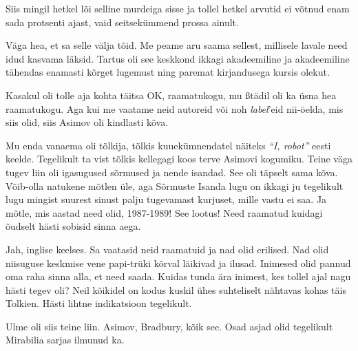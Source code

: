 Siis mingil hetkel lõi selline murdeiga sisse ja tollel hetkel arvutid ei 
võtnud enam sada protsenti ajast, vaid seitsekümmend prossa ainult. 


Väga hea, et sa selle välja tõid. Me peame aru saama sellest, millisele lavale  
need idud  kasvama läksid. 
Tartus oli see keskkond  ikkagi akadeemiline ja akadeemiline tähendas 
enamasti kõrget lugemust ning paremat kirjandusega kursis olekut.

Kasakul oli tolle aja kohta täitsa OK, raamatukogu, 
mu ßtädil oli ka üsna hea raamatukogu. Aga kui me vaatame neid autoreid või noh 
\emph{label}'eid nii-öelda, mis siis olid, siis Asimov oli 
kindlasti kõva. 

Mu enda vanaema oli tõlkija, tõlkis kuuekümnendatel näiteks \emph{\enquote{I, 
robot}} eesti keelde. Tegelikult ta vist tõlkis kellegagi koos terve Asimovi 
kogumiku. Teine väga tugev liin oli igasugused sõrmused ja nende 
isandad. See oli täpselt sama kõva.
Võib-olla natukene mõtlen üle, aga Sõrmuste Isanda lugu  on ikkagi 
ju tegelikult lugu  mingist suurest sinust palju tugevamast kurjuset, mille 
vastu ei saa. Ja mõtle, mis aastad need olid, 1987-1989! See lootus! Need 
raamatud kuidagi õudselt hästi sobisid sinna aega.


Jah, inglise keelses. Sa vaatasid neid raamatuid ja nad olid erilised. Nad olid 
niisuguse keskmise vene  papi-trüki kõrval läikivad ja ilusad. Inimesed olid 
pannud oma  raha sinna alla, et need saada.  Kuidas tunda ära   
inimest, kes tollel ajal nagu hästi tegev oli? Neil kõikidel on kodus kuskil 
ühes suhteliselt nähtavas kohas  täis Tolkien. Hästi lihtne indikatsioon 
tegelikult. 

Ulme  oli siis  teine liin. Asimov, Bradbury, kõik 
see. Osad asjad olid tegelikult Mirabilia sarjas 
ilmunud ka. 

